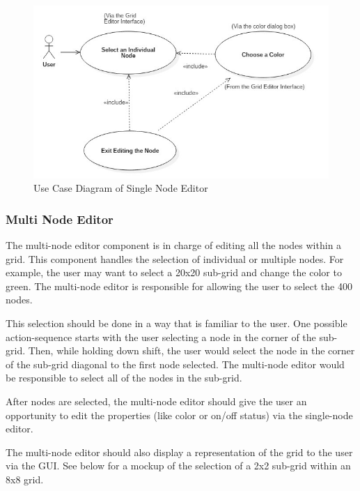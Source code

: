 \documentclass[12pt]{article}
\begin{document}
	\begin{figure}[ht!]
		\centering
		\includegraphics[width=150mm]{SingleNodeEditorDiagram.JPG}
		\caption{Use Case Diagram of Single Node Editor \label{overflow}}
	\end{figure}
	
	\subsubsection {Multi Node Editor}
	The multi-node editor component is in charge of editing all the nodes within a grid. This component handles the selection of individual or multiple nodes. For example, the user may want to select a 20x20 sub-grid and change the color to green. The multi-node editor is responsible for allowing the user to select the 400 nodes. 
	
	This selection should be done in a way that is familiar to the user. One possible action-sequence starts with the user selecting a node in the corner of the sub-grid. Then, while holding down shift, the user would select the node in the corner of the sub-grid diagonal to the first node selected. The multi-node editor would be responsible to select all of the nodes in the sub-grid.
	
	After nodes are selected, the multi-node editor should give the user an opportunity to edit the properties (like color or on/off status) via the single-node editor. 
	
	The multi-node editor should also display a representation of the grid to the user via the GUI. See below for a mockup of the selection of a 2x2 sub-grid within an 8x8 grid.
	
\end{document}
